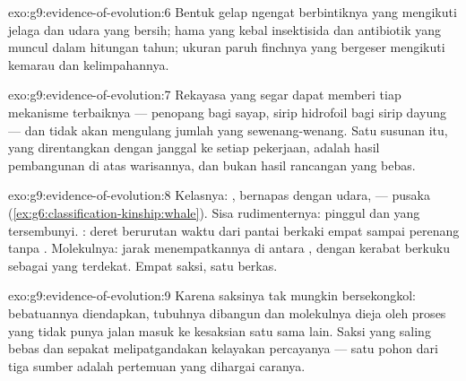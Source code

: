 \begin{solution}{exo:g9:evidence-of-evolution:6}
Bentuk gelap ngengat berbintiknya yang mengikuti jelaga dan
udara yang bersih; hama yang kebal insektisida dan antibiotik
yang muncul dalam hitungan tahun; ukuran paruh 
finchnya yang bergeser mengikuti kemarau dan kelimpahannya.
\end{solution}

\begin{solution}{exo:g9:evidence-of-evolution:7}
Rekayasa yang segar dapat memberi tiap 
mekanisme terbaiknya --- penopang bagi sayap, sirip hidrofoil
bagi sirip dayung --- dan tidak akan mengulang jumlah 
yang sewenang-wenang. Satu susunan itu, yang direntangkan
dengan janggal ke setiap pekerjaan, adalah hasil pembangunan
di atas warisannya, dan bukan hasil rancangan yang bebas.
\end{solution}

\begin{solution}{exo:g9:evidence-of-evolution:8}
Kelasnya: , bernapas dengan udara,   --- pusaka
 (\cref{ex:g6:classification-kinship:whale}). Sisa
rudimenternya:  pinggul dan  yang tersembunyi.
: deret berurutan waktu dari  pantai berkaki
empat sampai perenang tanpa . Molekulnya: jarak
 menempatkannya di antara , dengan kerabat
berkuku sebagai yang terdekat. Empat saksi, satu berkas.
\end{solution}

\begin{solution}{exo:g9:evidence-of-evolution:9}
Karena saksinya tak mungkin bersekongkol: bebatuannya
diendapkan, tubuhnya dibangun dan molekulnya dieja oleh
proses yang tidak punya jalan masuk ke kesaksian satu sama
lain. Saksi yang saling bebas dan sepakat melipatgandakan
kelayakan percayanya --- satu pohon dari tiga sumber adalah
pertemuan yang dihargai caranya.
\end{solution}

